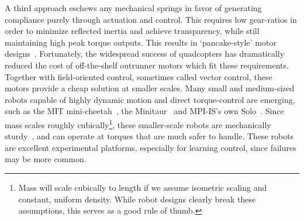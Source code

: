A third approach eschews any mechanical springs in favor of generating compliance purely through actuation and control. This requires low gear-ratios in order to minimize reflected inertia and achieve transparency, while still maintaining high peak torque outputs. This results in `pancake-style' motor designs~\cite{Seok2012proprioceptive}.
Fortunately, the widespread success of quadcopters has dramatically reduced the cost of off-the-shelf outrunner motors which fit these requirements. Together with field-oriented control, sometimes called vector control, these motors provide a cheap solution at smaller scales. Many small and medium-sized robots capable of highly dynamic motion and direct torque-control are emerging, such as the MIT mini-cheetah~\cite{katz2019mini}, the Minitaur~\cite{kenneally2016design} and MPI-IS's own Solo~\cite{grimminger2019open}. Since mass scales roughly cubically\footnote{Mass will scale cubically to length if we assume isometric scaling and constant, uniform density. While robot designs clearly break these assumptions, this serves as a good rule of thumb.}, these smaller-scale robots are mechanically sturdy~\cite{biewener2005biomechanical}, and can operate at torques that are much safer to handle. These robots are excellent experimental platforms, especially for learning control, since failures may be more common. \par





